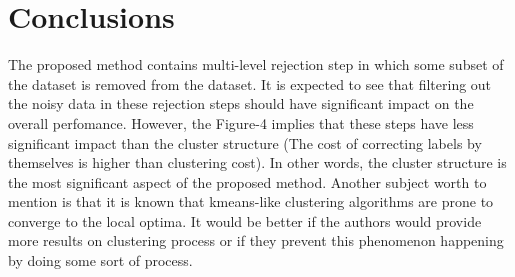 \documentclass[11pt]{article}
\begin{document}
\section{Conclusions}
The proposed method contains multi-level rejection step in which some subset of the dataset is removed from the dataset.
It is expected to see that filtering out the noisy data in these rejection steps should have significant impact on the overall perfomance.
However, the Figure-4 implies that these steps have less significant impact than the cluster structure (The cost of correcting labels by themselves is higher than clustering cost).
In other words, the cluster structure is the most significant aspect of the proposed method.
Another subject worth to mention is that it is known that kmeans-like clustering algorithms are prone to converge to the local optima.
It would be better if the authors would provide more results on clustering process or if they prevent this phenomenon happening by doing some sort of process.
% 
% 
\end{document}
